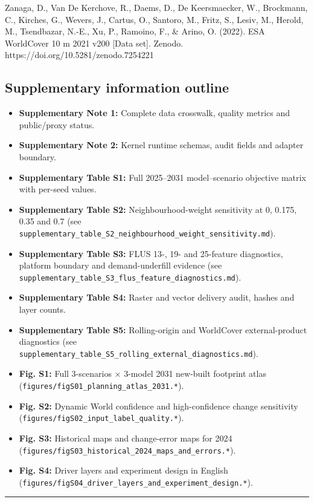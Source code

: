\documentclass[
]{article}
\providecommand{\tightlist}{%
  \setlength{\itemsep}{0pt}\setlength{\parskip}{0pt}}
\begin{document}
Zanaga, D., Van De Kerchove, R., Daems, D., De Keersmaecker, W.,
Brockmann, C., Kirches, G., Wevers, J., Cartus, O., Santoro, M., Fritz,
S., Lesiv, M., Herold, M., Tsendbazar, N.-E., Xu, P., Ramoino, F., \&
Arino, O. (2022). ESA WorldCover 10 m 2021 v200 {[}Data set{]}. Zenodo.
https://doi.org/10.5281/zenodo.7254221

\subsection{Supplementary information
outline}\label{supplementary-information-outline}

\begin{itemize}
\tightlist
\item
  \textbf{Supplementary Note 1:} Complete data crosswalk, quality
  metrics and public/proxy status.
\item
  \textbf{Supplementary Note 2:} Kernel runtime schemas, audit fields
  and adapter boundary.
\item
  \textbf{Supplementary Table S1:} Full 2025--2031 model--scenario
  objective matrix with per-seed values.
\item
  \textbf{Supplementary Table S2:} Neighbourhood-weight sensitivity at
  0, 0.175, 0.35 and 0.7 (see
  \texttt{supplementary\_table\_S2\_neighbourhood\_weight\_sensitivity.md}).
\item
  \textbf{Supplementary Table S3:} FLUS 13-, 19- and 25-feature
  diagnostics, platform boundary and demand-underfill evidence (see
  \texttt{supplementary\_table\_S3\_flus\_feature\_diagnostics.md}).
\item
  \textbf{Supplementary Table S4:} Raster and vector delivery audit,
  hashes and layer counts.
\item
  \textbf{Supplementary Table S5:} Rolling-origin and WorldCover
  external-product diagnostics (see
  \texttt{supplementary\_table\_S5\_rolling\_external\_diagnostics.md}).
\item
  \textbf{Fig. S1:} Full 3-scenarios × 3-model 2031 new-built footprint
  atlas (\texttt{figures/figS01\_planning\_atlas\_2031.*}).
\item
  \textbf{Fig. S2:} Dynamic World confidence and high-confidence change
  sensitivity (\texttt{figures/figS02\_input\_label\_quality.*}).
\item
  \textbf{Fig. S3:} Historical maps and change-error maps for 2024
  (\texttt{figures/figS03\_historical\_2024\_maps\_and\_errors.*}).
\item
  \textbf{Fig. S4:} Driver layers and experiment design in English
  (\texttt{figures/figS04\_driver\_layers\_and\_experiment\_design.*}).
\end{itemize}

\begin{center}\rule{0.5\linewidth}{0.5pt}\end{center}
\end{document}
